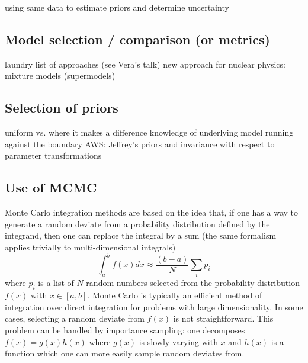   \bi
    \I using same data to estimate priors and determine uncertainty
  \ei


\subsection{Model selection / comparison (or metrics)}  \label{subsec:model_comparison}

  \bi
    \I laundry list of approaches (see Vera's talk)
    \I new approach for nuclear physics: mixture models (supermodels)
  \ei


\subsection{Selection of priors}  \label{subsec:selecting_priors}

  \bi
    \I uniform vs. where it makes a difference
    \I knowledge of underlying model 
    \I running against the boundary
    \I AWS: Jeffrey's priors and invariance with respect to
    parameter transformations
  \ei


\subsection{Use of MCMC}  \label{subsec:using_mcmc}

Monte Carlo integration methods are based on the idea that, if one
has a way to generate a random deviate from a probability distribution
defined by the integrand, then one can replace the integral by a sum
(the same formalism applies trivially to multi-dimensional integrals)
\begin{equation}
  \int_a^{b} f(x) dx \approx \frac{\left( b-a\right)}{N} \sum_i p_i 
\end{equation}
where $p_i$ is a list of $N$ random numbers selected from the
probability distribution $f(x)$ with $x \in [a,b]$. Monte
Carlo is typically an efficient method of integration
over direct integration for
problems with large dimensionality. In some cases,
selecting a random deviate from $f(x)$ is not straightforward.
This problem can be handled by importance sampling: one decomposes
$f(x)=g(x)h(x)$ where $g(x)$ is slowly varying with $x$ and $h(x)$
is a function which one can more easily sample random deviates from.

